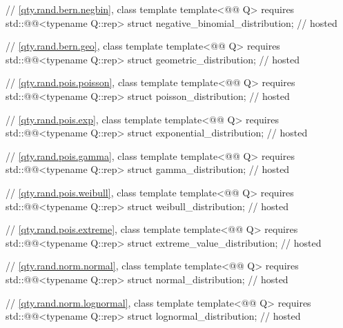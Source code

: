 \begin{codeblock}
{// \ref{qty.rand.bern.negbin}, class template 
template<@@ Q>
  requires std::@@<typename Q::rep>
struct negative_binomial_distribution;                                                  // hosted

// \ref{qty.rand.bern.geo}, class template 
template<@@ Q>
  requires std::@@<typename Q::rep>
struct geometric_distribution;                                                          // hosted

// \ref{qty.rand.pois.poisson}, class template 
template<@@ Q>
  requires std::@@<typename Q::rep>
struct poisson_distribution;                                                            // hosted

// \ref{qty.rand.pois.exp}, class template 
template<@@ Q>
  requires std::@@<typename Q::rep>
struct exponential_distribution;                                                        // hosted

// \ref{qty.rand.pois.gamma}, class template 
template<@@ Q>
  requires std::@@<typename Q::rep>
struct gamma_distribution;                                                              // hosted

// \ref{qty.rand.pois.weibull}, class template 
template<@@ Q>
  requires std::@@<typename Q::rep>
struct weibull_distribution;                                                            // hosted

// \ref{qty.rand.pois.extreme}, class template 
template<@@ Q>
  requires std::@@<typename Q::rep>
struct extreme_value_distribution;                                                      // hosted

// \ref{qty.rand.norm.normal}, class template 
template<@@ Q>
  requires std::@@<typename Q::rep>
struct normal_distribution;                                                             // hosted

// \ref{qty.rand.norm.lognormal}, class template 
template<@@ Q>
  requires std::@@<typename Q::rep>
struct lognormal_distribution;                                                          // hosted

}
\end{codeblock}

